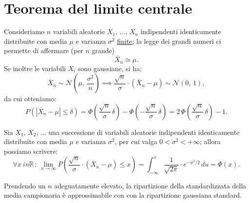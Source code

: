     \section{Teorema del limite centrale} 
        \begin{obsv}
            Consideriamo $n$ variabili aleatorie $X_1,\, \ldots,\, X_{n}$ indipendenti identicamente distribuite con media $\mu$ e varianza $\sigma^2$ \underline{finite}; la legge dei grandi numeri ci permette di affermare (per $n$ grande) \[
            \overline{X}_n \simeq \mu
            .\] Se inoltre le variabili $X_i$ sono gaussiane, si ha: \[
            \overline{X}_n \sim \mathcal{N}\left(\mu,\,\frac{\sigma^2}{n}\right) \implies
                \frac{\sqrt{n}}{\sigma} \cdot (\overline{X}_n - \mu) \sim \mathcal{N}(0,\,1) 
            ,\] da cui otteniamo: \[
            P\left(|\overline{X}_n - \mu| \leq \delta\right) = 
            \Phi\left(\frac{\sqrt{n}}{\sigma}\,\delta\right) - 
            \Phi\left(-\frac{\sqrt{n}}{\sigma}\,\delta\right) =
            2\, \Phi\left(\frac{\sqrt{n}}{\sigma}\,\delta\right) - 1
            .\]
        \end{obsv}
        \begin{thm}\label{thm:Teorema_limite_centrale}
            Sia $X_1,\, X_2,\, \ldots$ una successione di variabili aleatorie indipendenti identicamente distribuite con media $\mu$ e varianza $\sigma^2$, per cui valga $0 < \sigma^2 < +\infty$; allora possiamo scrivere:
            \begin{equation}\label{eq:Teorema_limite_centrale}
                \forall x\ in \mathbb{R} \,:\, \lim_{n \to \infty} P\left(\frac{\sqrt{n}}{\sigma} \cdot (\overline{X}_n - \mu) \leq x\right) = \int_{-\infty}^{x} \frac{1}{\sqrt{2\pi}}\cdot e^{-u^2 /2}\, du = \Phi(x)
            .\end{equation}
        \end{thm}
        \begin{obsv}
            Prendendo un $n$ adeguatamente elevato, la ripartizione della standardizzata della media campionaria è approssimabile con con la ripartizione gaussiana standard.
        \end{obsv}
